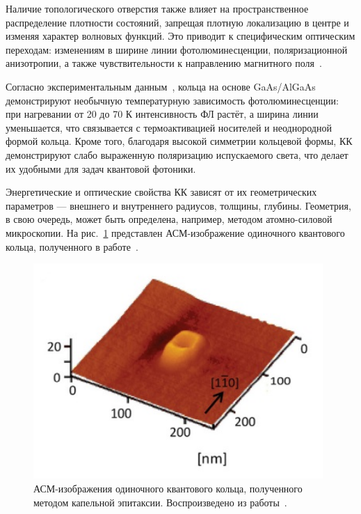 \documentclass[14pt,oneside]{extarticle}
\begin{document}
Наличие топологического отверстия также влияет на пространственное распределение плотности состояний, запрещая плотную локализацию в центре и изменяя характер волновых функций. Это приводит к специфическим оптическим переходам: изменениям в ширине линии фотолюминесценции, поляризационной анизотропии, а также чувствительности к направлению магнитного поля~\cite{Beo2020}.

Согласно экспериментальным данным~\cite{sibirmovskiy2018}, кольца на основе GaAs/AlGaAs демонстрируют необычную температурную зависимость фотолюминесценции: 
\\ при нагревании от 20 до 70 К интенсивность ФЛ растёт, а ширина линии уменьшается, что связывается с термоактивацией носителей и неоднородной формой кольца. Кроме того, благодаря высокой симметрии кольцевой формы, КК демонстрируют слабо выраженную поляризацию испускаемого света, что делает их удобными для задач квантовой фотоники.

Энергетические и оптические свойства КК зависят от их геометрических параметров — внешнего и внутреннего радиусов, толщины, глубины. Геометрия, в свою очередь, может быть определена, например, методом атомно-силовой микроскопии. На рис.~\ref{fig:elborg2} представлен АСМ-изображение одиночного квантового кольца, полученного в работе~\cite{elborg2017}.

\begin{figure}[H]
    \begin{center}
        \includegraphics[width=11cm]{images/elborg_fig2.png}
        \caption{\label{fig:elborg2}
            АСМ-изображения одиночного квантового кольца, полученного методом капельной эпитаксии. Воспроизведено из работы~\cite{elborg2017}.}
    \end{center}
\end{figure}
\end{document}
